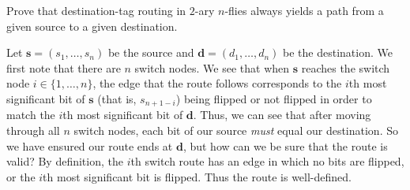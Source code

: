 \question Prove that destination-tag routing in $2$-ary $n$-flies always yields a path from a given source to a given destination.
\begin{solution}
  Let $\bm s = (s_1, \ldots, s_n)$ be the source and $\bm d = (d_1, \ldots, d_n)$ be the destination. We first note that there are $n$ switch nodes. We see that when $\bm s$ reaches the switch node $i \in \{1, \ldots, n\}$, the edge that the route follows corresponds to the $i$th most significant bit of $\bm s$ (that is, $s_{n+1-i}$) being flipped or not flipped in order to match the $i$th most significant bit of $\bm d$. Thus, we can see that after moving through all $n$ switch nodes, each bit of our source \emph{must} equal our destination. So we have ensured our route ends at $\bm d$, but how can we be sure that the route is valid? By definition, the $i$th switch route has an edge in which no bits are flipped, or the $i$th most significant bit is flipped. Thus the route is well-defined. 
\end{solution}

